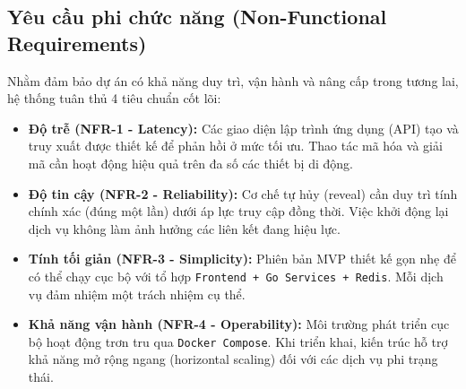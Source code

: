 \subsection{Yêu cầu phi chức năng (Non-Functional Requirements)}
Nhằm đảm bảo dự án có khả năng duy trì, vận hành và nâng cấp trong tương lai, hệ thống tuân thủ 4 tiêu chuẩn cốt lõi:
\begin{itemize}
    \item \textbf{Độ trễ (NFR-1 - Latency):} Các giao diện lập trình ứng dụng (API) tạo và truy xuất được thiết kế để phản hồi ở mức tối ưu. Thao tác mã hóa và giải mã cần hoạt động hiệu quả trên đa số các thiết bị di động.
    \item \textbf{Độ tin cậy (NFR-2 - Reliability):} Cơ chế tự hủy (reveal) cần duy trì tính chính xác (đúng một lần) dưới áp lực truy cập đồng thời. Việc khởi động lại dịch vụ không làm ảnh hưởng các liên kết đang hiệu lực.
    \item \textbf{Tính tối giản (NFR-3 - Simplicity):} Phiên bản MVP thiết kế gọn nhẹ để có thể chạy cục bộ với tổ hợp \texttt{Frontend + Go Services + Redis}. Mỗi dịch vụ đảm nhiệm một trách nhiệm cụ thể.
    \item \textbf{Khả năng vận hành (NFR-4 - Operability):} Môi trường phát triển cục bộ hoạt động trơn tru qua \texttt{Docker Compose}. Khi triển khai, kiến trúc hỗ trợ khả năng mở rộng ngang (horizontal scaling) đối với các dịch vụ phi trạng thái.
\end{itemize}